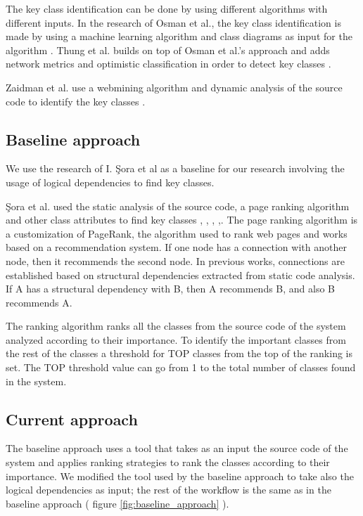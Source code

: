 \documentclass[runningheads]{comsis2}
\begin{document}
The key class identification can be done by using different algorithms with different inputs. In the research of Osman et al., the key class identification is made by using a machine learning algorithm and class diagrams as input for the algorithm \cite{6676885}. Thung et al. builds on top of Osman et al.’s approach and adds network metrics and optimistic classification in order to detect key classes \cite{rocclasification}.  

Zaidman et al. use a webmining algorithm and dynamic analysis of the source code to identify the key classes \cite{ZaidmanJurnal}.

\subsection{Baseline approach}
We use the research of I. Şora et al \cite{Finding-key-classes} as a baseline for our research involving the usage of logical dependencies to find key classes. 

Şora et al. used the static analysis of the source code, a page ranking algorithm and other class attributes to find key classes \cite{PagerankENASE}, \cite{enase15}, \cite{SoraSpringer}, \cite{PagerankSACI},\cite{Finding-key-classes}.
The page ranking algorithm is a customization of PageRank, the algorithm used to rank web pages \cite{ilprints422} and works based on a recommendation system. If one node has a connection with another node, then it recommends the second node. In previous works, connections are established based on structural dependencies extracted from static code analysis. If A has a structural dependency with B, then A recommends B, and also B recommends A.

The ranking algorithm ranks all the classes from the source code of the system analyzed according to their importance. To identify the important classes from the rest of the classes a threshold for TOP classes from the top of the ranking is set. The TOP threshold value can go from 1 to the total number of classes found in the system. 



\subsection{Current approach}

The baseline approach uses a tool that takes as an input the source code of the system and applies ranking strategies to rank the classes according to their importance. We modified the tool used by the baseline approach to take also the logical dependencies as input; the rest of the workflow is the same as in the baseline approach ( figure \ref{fig:baseline_approach} ).
\end{document}
